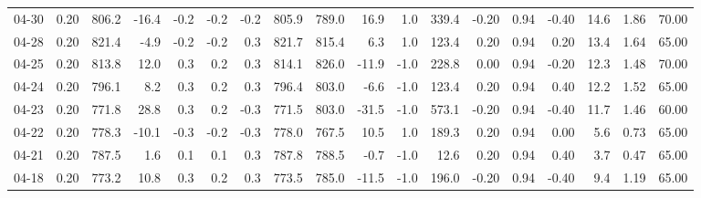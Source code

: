 \begin{threeparttable}
{\begin{tabular}{lrrrrrrrrrrrrrrrrr}
  04-30 &     0.20 & 806.2 &             -16.4 &              -0.2 &               -0.2 &               -0.2 & 805.9 & 789.0 &       16.9 &                      1.0 &               339.4 &      -0.20 &      0.94 &          -0.40 &             14.6 &            1.86 &                  70.00 \\
  04-28 &     0.20 & 821.4 &              -4.9 &              -0.2 &               -0.2 &                0.3 & 821.7 & 815.4 &        6.3 &                      1.0 &               123.4 &       0.20 &      0.94 &           0.20 &             13.4 &            1.64 &                  65.00 \\
  04-25 &     0.20 & 813.8 &              12.0 &               0.3 &                0.2 &                0.3 & 814.1 & 826.0 &      -11.9 &                     -1.0 &               228.8 &       0.00 &      0.94 &          -0.20 &             12.3 &            1.48 &                  70.00 \\
  04-24 &     0.20 & 796.1 &               8.2 &               0.3 &                0.2 &                0.3 & 796.4 & 803.0 &       -6.6 &                     -1.0 &               123.4 &       0.20 &      0.94 &           0.40 &             12.2 &            1.52 &                  65.00 \\
  04-23 &     0.20 & 771.8 &              28.8 &               0.3 &                0.2 &               -0.3 & 771.5 & 803.0 &      -31.5 &                     -1.0 &               573.1 &      -0.20 &      0.94 &          -0.40 &             11.7 &            1.46 &                  60.00 \\
  04-22 &     0.20 & 778.3 &             -10.1 &              -0.3 &               -0.2 &               -0.3 & 778.0 & 767.5 &       10.5 &                      1.0 &               189.3 &       0.20 &      0.94 &           0.00 &              5.6 &            0.73 &                  65.00 \\
  04-21 &     0.20 & 787.5 &               1.6 &               0.1 &                0.1 &                0.3 & 787.8 & 788.5 &       -0.7 &                     -1.0 &                12.6 &       0.20 &      0.94 &           0.40 &              3.7 &            0.47 &                  65.00 \\
  04-18 &     0.20 & 773.2 &              10.8 &               0.3 &                0.2 &                0.3 & 773.5 & 785.0 &      -11.5 &                     -1.0 &               196.0 &      -0.20 &      0.94 &          -0.40 &              9.4 &            1.19 &                  65.00 \\

\end{tabular}}
\end{threeparttable}
